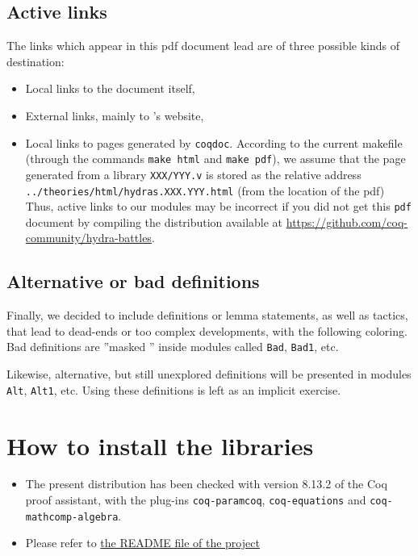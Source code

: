 \documentclass[a4paper]{book}
\begin{document}
\subsection{Active links}
The  links which appear in this pdf  document lead are of three possible kinds of destination:
\begin{itemize}
\item Local links to the document itself,
\item External links, mainly to \coq's website,
\item Local links to pages generated by \texttt{coqdoc}. According to the current makefile (through the commands \texttt{make html} and \texttt{make pdf}), 
  we assume that the page generated from a library \texttt{XXX/YYY.v} is stored as
the relative address \texttt{../theories/html/hydras.XXX.YYY.html} (from the location of the pdf)
Thus,  active links to our \coq{} modules may be incorrect if you did not get this \texttt{pdf} document by compiling the distribution available at
\url{https://github.com/coq-community/hydra-battles}.

\end{itemize}

\subsection{Alternative or bad definitions}
\label{sect:alt-proofs}
Finally, we decided to include definitions or lemma statements, as well as tactics,  that lead to
dead-ends or too complex developments, with the following coloring.
Bad definitions 
 are ''masked '' inside modules called \texttt{Bad}, \texttt{Bad1}, etc.





Likewise, alternative, but still unexplored definitions will be presented in modules
\texttt{Alt}, \texttt{Alt1}, etc. Using these definitions is left as an implicit exercise.





\section{How to install the libraries}
\label{sec:orgheadline4}
\begin{itemize}
\item The present distribution has been checked with version 8.13.2 of the Coq proof assistant, with the plug-ins \texttt{coq-paramcoq}, \texttt{coq-equations}
and \texttt{coq-mathcomp-algebra}.

\item Please refer to \href{https://github.com/coq-community/hydra-battles#readme}{the README file of the project}
\end{itemize}
\end{document}
